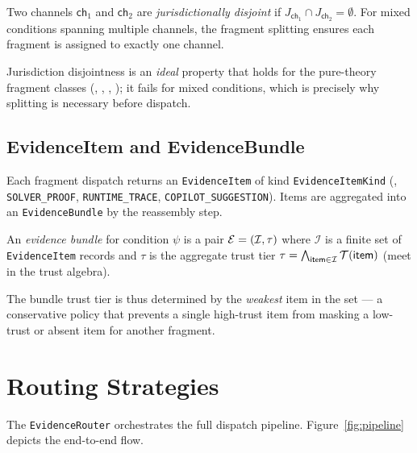 \documentclass[11pt]{article}
\newcommand{\VC}{\psi}                    %
\begin{document}
\begin{definition}\label{def:juris-disjoint}
Two channels $\mathsf{ch}_1$ and $\mathsf{ch}_2$ are
\emph{jurisdictionally disjoint} if
$J_{\mathsf{ch}_1} \cap J_{\mathsf{ch}_2} = \emptyset$.  For mixed
conditions spanning multiple channels, the fragment splitting ensures
each fragment is assigned to exactly one channel.
\end{definition}

\begin{remark}
Jurisdiction disjointness is an \emph{ideal} property that holds for
the pure-theory fragment classes (\QFLIA, \QFLRA, \QFBV, \QFUF); it
fails for mixed conditions, which is precisely why splitting is
necessary before dispatch.
\end{remark}

\subsection{EvidenceItem and EvidenceBundle}\label{sec:bundle}

Each fragment dispatch returns an \texttt{EvidenceItem} of kind
\texttt{EvidenceItemKind} (\eg, \texttt{SOLVER\_PROOF},
\texttt{RUNTIME\_TRACE}, \texttt{COPILOT\_SUGGESTION}).  Items are
aggregated into an \texttt{EvidenceBundle} by the reassembly step.

\begin{definition}\label{def:bundle}
An \emph{evidence bundle} for condition $\VC$ is a pair
$\mathcal{E} = (\mathcal{I}, \tau)$ where $\mathcal{I}$ is a finite set of
\texttt{EvidenceItem} records and $\tau$ is the aggregate trust tier
$\tau = \bigwedge_{\mathsf{item} \in \mathcal{I}} \mathcal{T}(\mathsf{item})$
(meet in the trust algebra).
\end{definition}

The bundle trust tier is thus determined by the \emph{weakest} item in
the set — a conservative policy that prevents a single high-trust item
from masking a low-trust or absent item for another fragment.

\section{Routing Strategies}\label{sec:routing}

The \texttt{EvidenceRouter} orchestrates the full dispatch pipeline.
Figure~\ref{fig:pipeline} depicts the end-to-end flow.
\end{document}

